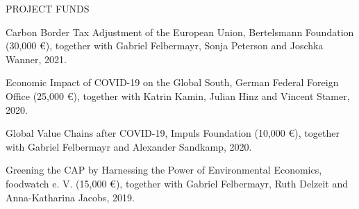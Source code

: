 \documentclass{article}
\begin{document}

\begin{minipage}[t]{0.12\textwidth}
    {\selectfont PROJECT FUNDS} \\
\end{minipage}
\hspace{5mm}
\begin{minipage}[t]{0.8\textwidth}
    Carbon Border Tax Adjustment of the European Union, Bertelsmann Foundation (30,000 \euro{}), together with Gabriel Felbermayr, Sonja Peterson and Joschka Wanner, 2021. \par
    Economic Impact of COVID-19 on the Global South, German Federal Foreign Office (25,000 \euro{}), together with Katrin Kamin, Julian Hinz and Vincent Stamer, 2020. \par
    Global Value Chains after COVID-19, Impuls Foundation (10,000 \euro{}), together with Gabriel Felbermayr and Alexander Sandkamp, 2020. \par
    Greening the CAP by Harnessing the Power of Environmental Economics, foodwatch e. V. (15,000 \euro{}), together with  Gabriel Felbermayr, Ruth Delzeit and Anna-Katharina Jacobs, 2019.
\end{minipage}
\medskip

\end{document}
